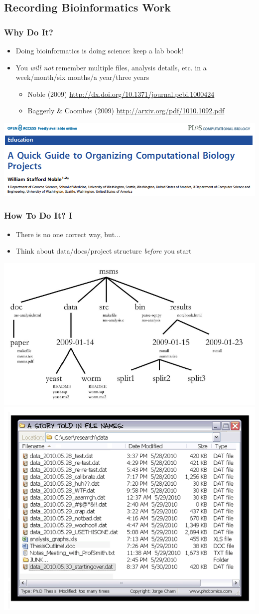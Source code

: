 %

\subsection{Recording Bioinformatics Work}
\begin{frame}
  \frametitle{Why Do It?}
  \begin{itemize}
    \item Doing bioinformatics is doing science: keep a lab book!
    \item You \emph{will not} remember multiple files, analysis details, etc. in a week/month/six months/a year/three years
    \begin{itemize}
      \item Noble (2009) \url{http://dx.doi.org/10.1371/journal.pcbi.1000424}
      \item Baggerly \& Coombes (2009) \url{http://arxiv.org/pdf/1010.1092.pdf}
    \end{itemize}
  \end{itemize}
  \includegraphics[width=.6\textwidth]{images/noble_2009_head}
\end{frame}
   
\begin{frame}
  \frametitle{How To Do It? I}
  \begin{itemize}
    \item There is no one correct way, but$\ldots$
    \item Think about data/docs/project structure \textit{before} you start
  \end{itemize}
  \begin{center}
    \includegraphics[width=.5\textwidth]{images/project_structure}
    \includegraphics[width=.5\textwidth]{images/phd052810s}
  \end{center}
\end{frame}

